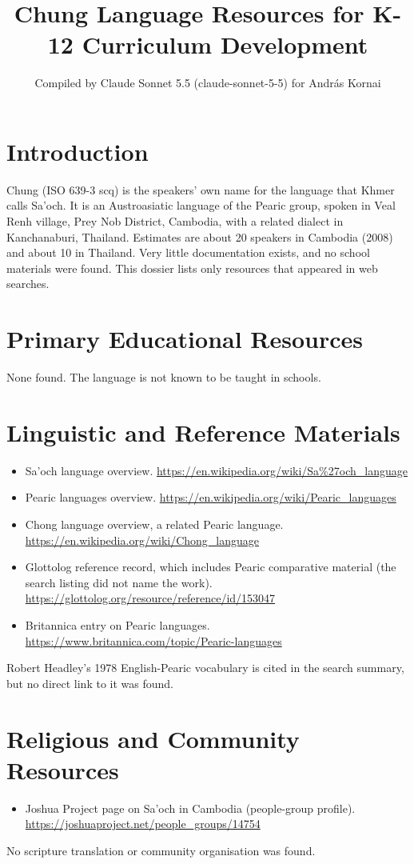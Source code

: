 \documentclass[12pt]{article}
\title{Chung Language Resources for K-12 Curriculum Development}
\author{Compiled by Claude Sonnet 5.5 (claude-sonnet-5-5) for Andr\'as Kornai}
\date{}
\begin{document}
\maketitle

\section{Introduction}
Chung (ISO 639-3 scq) is the speakers' own name for the language that Khmer calls Sa'och. It is an Austroasiatic language of the Pearic group, spoken in Veal Renh village, Prey Nob District, Cambodia, with a related dialect in Kanchanaburi, Thailand. Estimates are about 20 speakers in Cambodia (2008) and about 10 in Thailand. Very little documentation exists, and no school materials were found. This dossier lists only resources that appeared in web searches.

\section{Primary Educational Resources}
None found. The language is not known to be taught in schools.

\section{Linguistic and Reference Materials}
\begin{itemize}
\item Sa'och language overview. \url{https://en.wikipedia.org/wiki/Sa%27och_language}
\item Pearic languages overview. \url{https://en.wikipedia.org/wiki/Pearic_languages}
\item Chong language overview, a related Pearic language. \url{https://en.wikipedia.org/wiki/Chong_language}
\item Glottolog reference record, which includes Pearic comparative material (the search listing did not name the work). \url{https://glottolog.org/resource/reference/id/153047}
\item Britannica entry on Pearic languages. \url{https://www.britannica.com/topic/Pearic-languages}
\end{itemize}
Robert Headley's 1978 English-Pearic vocabulary is cited in the search summary, but no direct link to it was found.

\section{Religious and Community Resources}
\begin{itemize}
\item Joshua Project page on Sa'och in Cambodia (people-group profile). \url{https://joshuaproject.net/people_groups/14754}
\end{itemize}
No scripture translation or community organisation was found.
\end{document}
